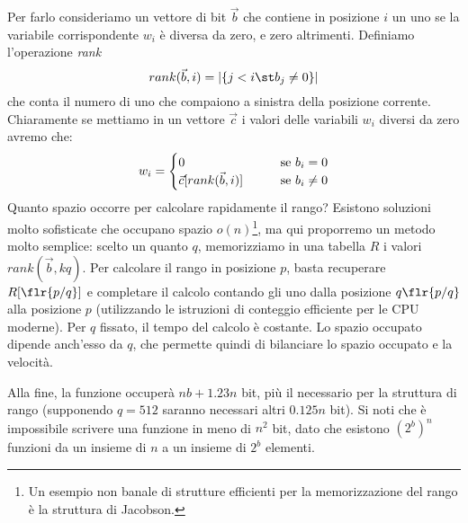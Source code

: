 Per farlo consideriamo un vettore di bit $\vec{b}$ che contiene in posizione $i$ un uno se la variabile corrispondente $w_i$ è diversa da zero, e zero altrimenti. Definiamo l'operazione \textit{rank}
\begin{equation}
	rank(\vec{b}, i) = |\{j < i \st b_j \neq 0\}|
\end{equation}
che conta il numero di uno che compaiono a sinistra della posizione corrente. Chiaramente se mettiamo in un vettore $\vec{c}$ i valori delle variabili $w_i$ diversi da zero avremo che:
\begin{equation}
	w_i =
	\begin{cases}
		0 \hspace{7mm}                         & \textnormal{se } b_i = 0    \\
		\vec{c}[rank(\vec{b}, i)] \hspace{7mm} & \textnormal{se } b_i \neq 0 \\
	\end{cases}
\end{equation}
Quanto spazio occorre per calcolare rapidamente il rango? Esistono soluzioni molto sofisticate che occupano spazio $o(n)$\footnote{Un esempio non banale di strutture efficienti per la memorizzazione del rango è la struttura di Jacobson.}, ma qui proporremo un metodo molto semplice: scelto un quanto $q$, memorizziamo in una tabella $R$ i valori $rank(\vec{b}, kq)$. Per calcolare il rango in posizione $p$, basta recuperare $R[\flr{p / q}]$ e completare il calcolo contando gli uno dalla posizione $q\flr{p / q}$ alla posizione $p$ (utilizzando le istruzioni di conteggio efficiente per le CPU moderne). Per $q$ fissato, il tempo del calcolo è costante. Lo spazio occupato dipende anch'esso da $q$, che permette quindi di bilanciare lo spazio occupato e la velocità.

Alla fine, la funzione occuperà $nb + 1.23n$ bit, più il necessario per la struttura di rango (supponendo $q = 512$ saranno necessari altri $0.125n$ bit). Si noti che è impossibile scrivere una funzione in meno di $n^2$ bit, dato che esistono $(2^b)^n$ funzioni da un insieme di $n$ a un insieme di $2^b$ elementi.
